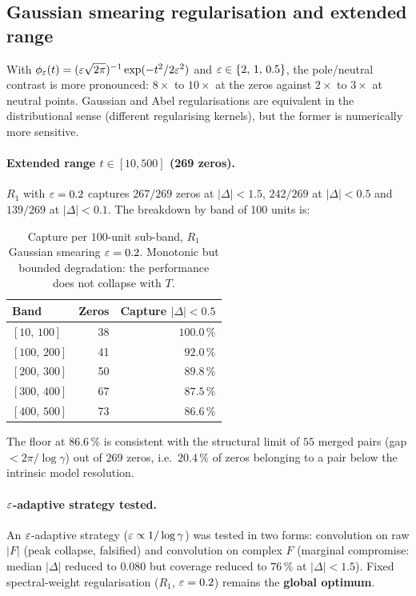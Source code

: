 \subsection{Gaussian smearing regularisation and extended range}
\label{sec:verif_smearing}

With $\phi_\varepsilon(t) = (\varepsilon \sqrt{2\pi})^{-1} \exp(-t^{2} / 2\varepsilon^{2})$ and
$\varepsilon \in \{2,\,1,\,0.5\}$, the pole/neutral contrast is more
pronounced: $8\times$ to $10\times$ at the zeros against $2\times$
to $3\times$ at neutral points. Gaussian and Abel regularisations
are equivalent in the distributional sense (different regularising
kernels), but the former is numerically more sensitive.

\paragraph{Extended range $t \in [10, 500]$ (269 zeros).}
$R_1$ with $\varepsilon = 0.2$ captures $267/269$ zeros at $|\Delta| < 1.5$,
$242/269$ at $|\Delta| < 0.5$ and $139/269$ at $|\Delta| < 0.1$.
The breakdown by band of 100 units is:

\begin{table}[ht]
\centering
\begin{tabular}{@{}lrr@{}}
\toprule
\textbf{Band} & \textbf{Zeros} & \textbf{Capture $|\Delta| < 0.5$}\\
\midrule
$[10,\,100]$ & 38 & $100.0\,\%$\\
$[100,\,200]$ & 41 & $92.0\,\%$\\
$[200,\,300]$ & 50 & $89.8\,\%$\\
$[300,\,400]$ & 67 & $87.5\,\%$\\
$[400,\,500]$ & 73 & $86.6\,\%$\\
\bottomrule
\end{tabular}
\caption{Capture per $100$-unit sub-band, $R_1$ Gaussian smearing
$\varepsilon = 0.2$. Monotonic but bounded degradation: the performance
does not collapse with $T$.}
\label{tab:bandes}
\end{table}

The floor at $86.6\,\%$ is consistent with the structural limit of
$55$ merged pairs (gap $< 2\pi/\log\gamma$) out of $269$ zeros, i.e.\
$20.4\,\%$ of zeros belonging to a pair below the intrinsic model
resolution.

\paragraph{$\varepsilon$-adaptive strategy tested.}
An $\varepsilon$-adaptive strategy ($\varepsilon \propto 1/\log\gamma$) was tested
in two forms: convolution on raw $|F|$ (peak collapse, falsified)
and convolution on complex $F$ (marginal compromise: median
$|\Delta|$ reduced to $0.080$ but coverage reduced to $76\,\%$ at
$|\Delta| < 1.5$). Fixed spectral-weight regularisation ($R_1$,
$\varepsilon = 0.2$) remains the \textbf{global optimum}.
